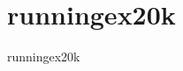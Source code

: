 \section{runningex20k}
\label{sec:dataSets:runningex20k}
\begin{dataSetDescription}{runningex20k}
\end{dataSetDescription}

